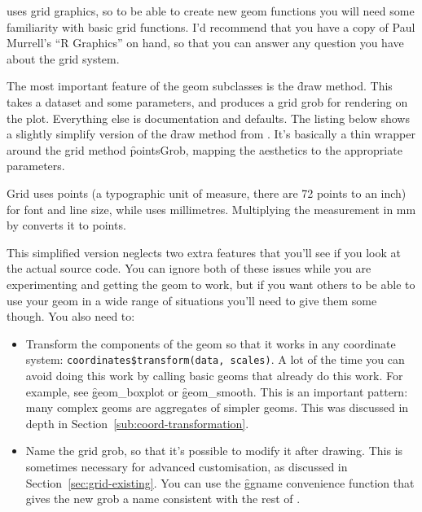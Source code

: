 \ggplot uses grid graphics, so to be able to create new geom functions you will need some familiarity with basic grid functions.  I'd recommend that you have a copy of Paul Murrell's ``R Graphics'' on hand, so that you can answer any question you have about the grid system.

The most important feature of the geom subclasses is the \f{draw} method.  This takes a dataset and some parameters, and produces a grid grob for rendering on the plot.  Everything else is documentation and defaults.  The listing below shows a slightly simplify version of the \f{draw} method from .  It's basically a thin wrapper around the grid method \f{pointsGrob}, mapping the aesthetics to the appropriate parameters.

% 


Grid uses points (a typographic unit of measure, there are 72 points to an inch) for font and line size, while \ggplot uses millimetres.  Multiplying the   measurement in mm by  converts it to points.  

This simplified version neglects two extra features that you'll see if you look at the actual source code.  You can ignore both of these issues while you are experimenting and getting the geom to work, but if you want others to be able to use your geom in a wide range of situations you'll need to give them some though.  You also need to:

\begin{itemize}
  \item Transform the components of the geom so that it works in any coordinate system: \verb|coordinates$transform(data, scales)|.  A lot of the time you can avoid doing this work by calling basic geoms that already do this work.  For example, see \f{geom_boxplot} or \f{geom_smooth}.  This is an important pattern: many complex geoms are aggregates of simpler geoms.  This was discussed in depth in Section~\ref{sub:coord-transformation}.

  \item Name the grid grob, so that it's possible to modify it after drawing.  This is sometimes necessary for advanced customisation, as discussed in Section~\ref{sec:grid-existing}.  You can use the \f{ggname} convenience function that gives the new grob a name consistent with the rest of \ggplot.
\end{itemize}

